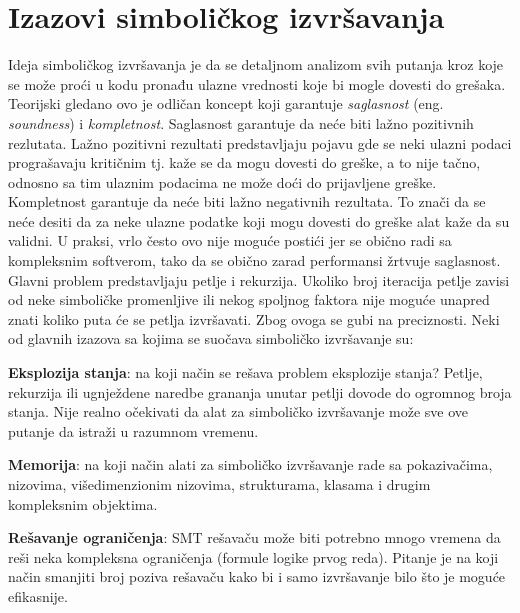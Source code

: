 \documentclass[12pt,oneside]{memoir}
\begin{document}
\section{Izazovi simboličkog izvršavanja}

Ideja simboličkog izvršavanja je da se detaljnom analizom svih putanja kroz koje se može proći u kodu pronađu ulazne vrednosti koje bi mogle dovesti do grešaka. Teorijski gledano ovo je odličan koncept koji garantuje \textit{saglasnost} (eng. \textit{soundness}) i \textit{kompletnost}. Saglasnost garantuje da neće biti lažno pozitivnih rezlutata. Lažno pozitivni rezultati predstavljaju pojavu gde se neki ulazni podaci prograšavaju kritičnim tj. kaže se da mogu dovesti do greške, a to nije tačno, odnosno sa tim ulaznim podacima ne može doći do prijavljene greške. Kompletnost garantuje da neće biti lažno negativnih rezultata. To znači da se neće desiti da za neke ulazne podatke koji mogu dovesti do greške alat kaže da su validni. U praksi, vrlo često ovo nije moguće postići jer se obično radi sa kompleksnim softverom, tako da se obično zarad performansi žrtvuje saglasnost. Glavni problem predstavljaju petlje i rekurzija. Ukoliko broj iteracija petlje zavisi od neke simboličke promenljive ili nekog spoljnog faktora nije moguće unapred znati koliko puta će se petlja izvršavati. Zbog ovoga se gubi na preciznosti. Neki od glavnih izazova sa kojima se suočava simboličko izvršavanje su: 

\begin{description}
    \item \textbf{Eksplozija stanja}: na koji način se rešava problem eksplozije stanja? Petlje, rekurzija ili ugnježdene naredbe grananja unutar petlji dovode do ogromnog broja stanja. Nije realno očekivati da alat za simboličko izvršavanje može sve ove putanje da istraži u razumnom vremenu.
    
    \item \textbf{Memorija}: na koji način alati za simboličko izvršavanje rade sa pokazivačima, nizovima, višedimenzionim nizovima, strukturama, klasama i drugim kompleksnim objektima.

    \item \textbf{Rešavanje ograničenja}: SMT rešavaču može biti potrebno mnogo vremena da reši neka kompleksna ograničenja (formule logike prvog reda). Pitanje je na koji način smanjiti broj poziva rešavaču kako bi i samo izvršavanje bilo što je moguće efikasnije.
    
\end{description}
\end{document}
